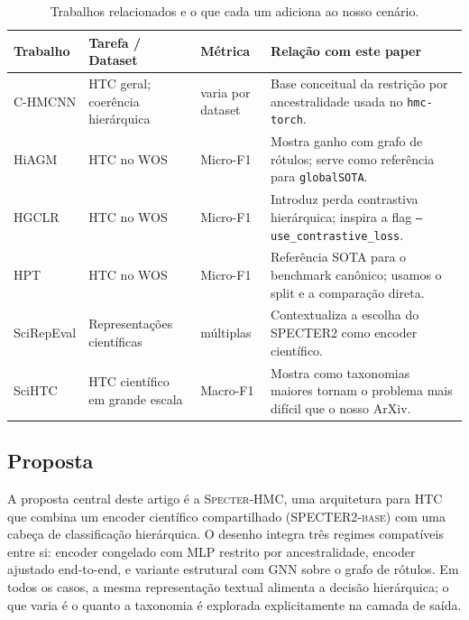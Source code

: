 \documentclass[11pt,a4paper,twoside]{article}
\begin{document}
\begin{table}[htbp]
\centering
\small
\caption{Trabalhos relacionados e o que cada um adiciona ao nosso cenário.}
\label{tab:related_works}
\begin{tabular}{p{3.1cm}p{3.1cm}p{2.3cm}p{4.3cm}}
\toprule
\textbf{Trabalho} & \textbf{Tarefa / Dataset} & \textbf{Métrica} & \textbf{Relação com este paper} \\
\midrule
C-HMCNN \cite{giunchiglia2020coherent}
& HTC geral; coerência hierárquica
& varia por dataset
& Base conceitual da restrição por ancestralidade usada no \texttt{hmc-torch}. \\
\addlinespace
HiAGM \cite{zhou2020hiagm}
& HTC no WOS
& Micro-F1
& Mostra ganho com grafo de rótulos; serve como referência para \texttt{globalSOTA}. \\
\addlinespace
HGCLR \cite{wang2022hgclr}
& HTC no WOS
& Micro-F1
& Introduz perda contrastiva hierárquica; inspira a flag \texttt{--use\_contrastive\_loss}. \\
\addlinespace
HPT \cite{wang2022hpt}
& HTC no WOS
& Micro-F1
& Referência SOTA para o benchmark canônico; usamos o split e a comparação direta. \\
\addlinespace
SciRepEval \cite{singh2022scirepeval}
& Representações científicas
& múltiplas
& Contextualiza a escolha do \textsc{SPECTER2} como encoder científico. \\
\addlinespace
SciHTC \cite{sadat2022scitc}
& HTC científico em grande escala
& Macro-F1
& Mostra como taxonomias maiores tornam o problema mais difícil que o nosso ArXiv. \\
\bottomrule
\end{tabular}
\end{table}

\subsection{Proposta}
\label{sec:proposal}

A proposta central deste artigo é a \textsc{Specter-HMC}, uma arquitetura para
HTC que combina um encoder científico compartilhado (\textsc{SPECTER2-base})
com uma cabeça de classificação hierárquica. O desenho integra três regimes
compatíveis entre si: encoder congelado com MLP restrito por ancestralidade,
encoder ajustado end-to-end, e variante estrutural com GNN sobre o grafo de
rótulos. Em todos os casos, a mesma representação textual alimenta a decisão
hierárquica; o que varia é o quanto a taxonomia é explorada explicitamente na
camada de saída.
\end{document}
